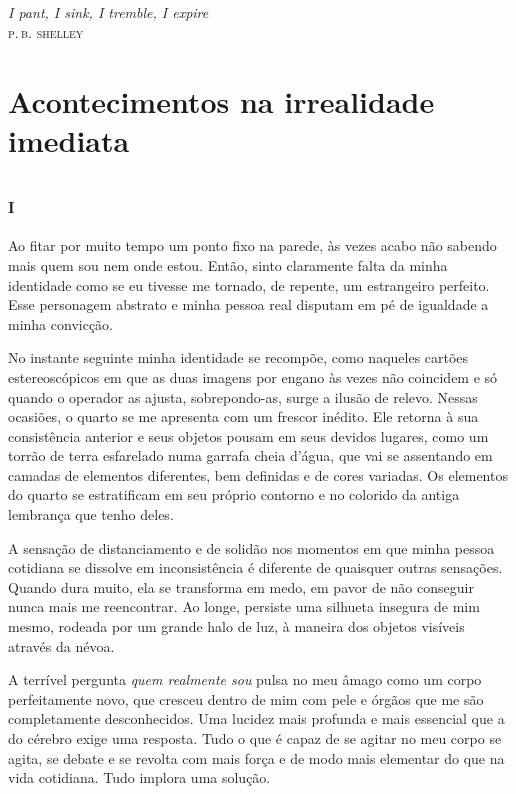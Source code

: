 \chapter*{}
\thispagestyle{empty}

\vfill
\begin{flushright}
\textit{I pant, I sink, I tremble, I expire}\\
{\centering\textsc{p.\,b. shelley}}
\end{flushright}

\part{Acontecimentos na irrealidade imediata}

\openany
\chapter*{\huge\centering\textsc{i}}

Ao fitar por muito tempo um ponto fixo na parede, às vezes acabo não sabendo mais quem sou nem onde estou. Então, sinto claramente falta da minha identidade como se eu tivesse me tornado, de repente, um estrangeiro perfeito. Esse personagem abstrato e minha pessoa real disputam em pé de igualdade a minha convicção.

No instante seguinte minha identidade se recompõe, como naqueles cartões estereoscópicos em que as duas imagens por engano às vezes não coincidem e só quando o operador as ajusta, sobrepondo-as, surge a ilusão de relevo. Nessas ocasiões, o quarto se me apresenta com um frescor inédito. Ele retorna à sua consistência anterior e seus objetos pousam em seus devidos lugares, como um torrão de terra esfarelado numa garrafa cheia d'água, que vai se assentando em camadas de elementos diferentes, bem definidas e de cores variadas. Os elementos do quarto se estratificam em seu próprio contorno e no colorido da antiga lembrança que tenho deles.

A sensação de distanciamento e de solidão nos momentos em que minha pessoa cotidiana se dissolve em inconsistência é diferente de quaisquer outras sensações. Quando dura muito, ela se transforma em medo, em pavor de não conseguir nunca mais me reencontrar. Ao longe, persiste uma silhueta insegura de mim mesmo, rodeada por um grande halo de luz, à maneira dos objetos visíveis através da névoa.

A terrível pergunta \textit{quem realmente sou} pulsa no meu âmago como um corpo perfeitamente novo, que cresceu dentro de mim com pele e órgãos que me são completamente desconhecidos. Uma lucidez mais profunda e mais essencial que a do cérebro exige uma resposta. Tudo o que é capaz de se agitar no meu corpo se agita, se debate e se revolta com mais força e de modo mais elementar do que na vida cotidiana. Tudo implora uma solução.

